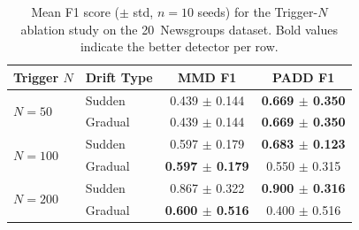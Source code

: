 \begin{table}[htbp]
  \centering
  \caption{Mean F1 score ($\pm$ std, $n=10$ seeds) for the Trigger-$N$ ablation
           study on the 20~Newsgroups dataset.
           Bold values indicate the better detector per row.}
  \label{tab:ablation_f1}
  \begin{tabular}{llcc}
    \toprule
    \textbf{Trigger $N$} & \textbf{Drift Type}
      & \textbf{MMD F1} & \textbf{PADD F1} \\
    \midrule
    \multirow{2}{*}{$N=50$} & Sudden & 0.439 $\pm$ 0.144 & \textbf{0.669 $\pm$ 0.350} \\
     & Gradual & 0.439 $\pm$ 0.144 & \textbf{0.669 $\pm$ 0.350} \\
    \midrule
    \multirow{2}{*}{$N=100$} & Sudden & 0.597 $\pm$ 0.179 & \textbf{0.683 $\pm$ 0.123} \\
     & Gradual & \textbf{0.597 $\pm$ 0.179} & 0.550 $\pm$ 0.315 \\
    \midrule
    \multirow{2}{*}{$N=200$} & Sudden & 0.867 $\pm$ 0.322 & \textbf{0.900 $\pm$ 0.316} \\
     & Gradual & \textbf{0.600 $\pm$ 0.516} & 0.400 $\pm$ 0.516 \\
    \bottomrule
  \end{tabular}
\end{table}
